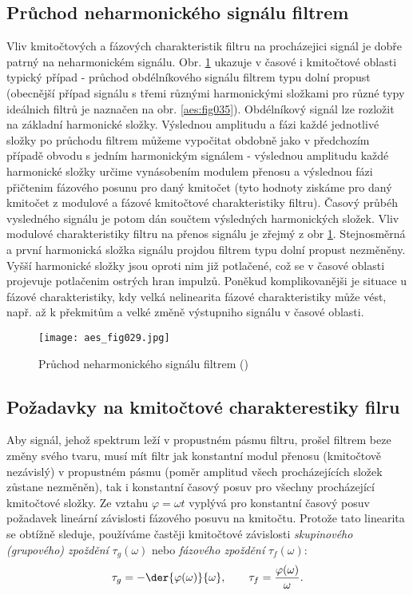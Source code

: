     \subsection{Průchod neharmonického signálu filtrem}
      Vliv kmitočtových a fázových charakteristik filtru na procházejici signál je dobře patrný na
      neharmonickém signálu. Obr. \ref{aes:fig029}  ukazuje v časové i kmitočtové oblasti typický
      případ - průchod obdélníkového signálu filtrem typu dolní propust (obecnější případ signálu
      s třemi různými harmonickými složkami pro různé typy ideálnich filtrů je naznačen na obr.
      \ref{aes:fig035}). Obdélníkový signál lze rozložit na základní harmonické složky. Výslednou
      amplitudu a fázi každé jednotlivé složky po průchodu filtrem můžeme vypočitat obdobně jako v
      předchozím případě obvodu s jedním harmonickým signálem - výslednou amplitudu každé
      harmonické složky určime vynásobením modulem přenosu a výslednou fázi přičtenim fázového
      posunu pro daný kmitočet (tyto hodnoty ziskáme pro daný kmitočet z modulové a fázové
      kmitočtové charakteristiky filtru). Časový průbéh vysledného signálu je potom dán součtem
      výsledných harmonických složek. Vliv modulové charakteristiky filtru na přenos signálu je
      zřejmý z obr \ref{aes:fig029}. Stejnosměrná a první harmonická složka signálu projdou
      filtrem typu dolní propust nezměněny. Vyšší harmonické složky jsou oproti nim již potlačené,
      což se v časové oblasti projevuje potlačenim ostrých hran impulzů. Poněkud komplikovanějši
      je situace u fázové charakteristiky, kdy velká nelinearita fázové charakteristiky může vést,
      např. až k překmitům a velké změně výstupniho signálu v časové oblasti. 

      \begin{figure}[ht!]
        \centering
        \texttt{[image: aes\_fig029.jpg]}
        \caption{Průchod neharmonického signálu filtrem (\cite[s.~29]{HajekSedlacek2002})}
        \label{aes:fig029}    
      \end{figure}
    
    \subsection{Požadavky na kmitočtové charakterestiky filru} 
      Aby signál, jehož spektrum leží v propustném pásmu filtru, prošel filtrem beze změny svého
      tvaru, musí mít filtr jak konstantní modul přenosu (kmitočtově nezávislý) v propustném pásmu
      (poměr amplitud všech procházejících složek zůstane nezměněn), tak i konstantní časový posuv
      pro všechny procházející kmitočtové složky. Ze vztahu \(\varphi = \omega t\) vyplývá pro
      konstantní časový posuv požadavek lineární závislosti fázového posuvu na kmitočtu. Protože
      tato linearita se obtížně sleduje, používáme častěji kmitočtové závislosti \emph{skupinového
      (grupového) zpoždění} \(\tau_g(\omega)\) nebo \emph{fázového zpoždění} \(\tau_f(\omega)\): 
      \begin{equation*}
        \tau_g = -\der{\varphi(\omega)}{\omega}, \qquad \tau_f = \frac{\varphi(\omega)}{\omega}.
      \end{equation*}
      
